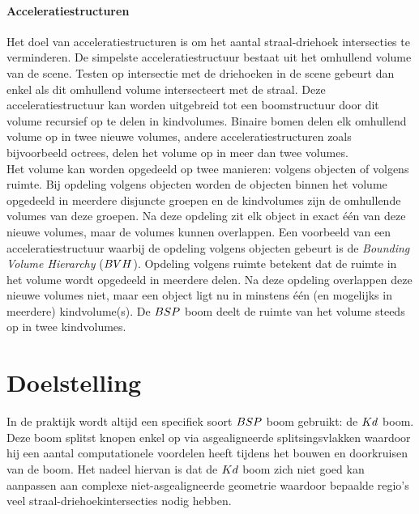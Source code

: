 

\paragraph{Acceleratiestructuren}
Het doel van acceleratiestructuren is om het aantal straal-driehoek intersecties te verminderen.
De simpelste acceleratiestructuur bestaat uit het omhullend volume van de scene.
Testen op intersectie met de driehoeken in de scene gebeurt dan enkel als dit omhullend volume intersecteert met de straal.
Deze acceleratiestructuur kan worden uitgebreid tot een boomstructuur door dit volume recursief op te delen in kindvolumes.
Binaire bomen delen elk omhullend volume op in twee nieuwe volumes, andere acceleratiestructuren zoals bijvoorbeeld octrees, delen het volume op in meer dan twee volumes.
\\

Het volume kan worden opgedeeld op twee manieren: volgens objecten of volgens ruimte.
Bij opdeling volgens objecten worden de objecten binnen het volume opgedeeld in meerdere disjuncte groepen en de kindvolumes zijn de omhullende volumes van deze groepen.
Na deze opdeling zit elk object in exact één van deze nieuwe volumes, maar de volumes kunnen overlappen.
Een voorbeeld van een acceleratiestructuur waarbij de opdeling volgens objecten gebeurt is de \textit{Bounding Volume Hierarchy} ($BVH$).
Opdeling volgens ruimte betekent dat de ruimte in het volume wordt opgedeeld in meerdere delen.
Na deze opdeling overlappen deze nieuwe volumes niet, maar een object ligt nu in minstens één (en mogelijks in meerdere) kindvolume(s).
De $BSP$ boom deelt de ruimte van het volume steeds op in twee kindvolumes.

\section{Doelstelling}
In de praktijk wordt altijd een specifiek soort $BSP$ boom gebruikt: de $Kd$ boom.
Deze boom splitst knopen enkel op via asgealigneerde splitsingsvlakken waardoor hij een aantal computationele voordelen heeft tijdens het bouwen en doorkruisen van de boom.
Het nadeel hiervan is dat de $Kd$ boom zich niet goed kan aanpassen aan complexe niet-asgealigneerde geometrie waardoor bepaalde regio's veel straal-driehoekintersecties nodig hebben.\\

